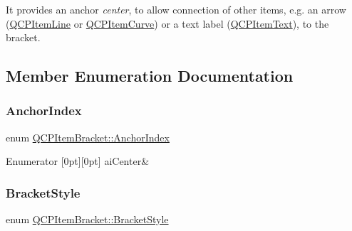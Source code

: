It provides an anchor {\itshape center}, to allow connection of other items, e.\+g. an arrow (\hyperlink{class_q_c_p_item_line}{Q\+C\+P\+Item\+Line} or \hyperlink{class_q_c_p_item_curve}{Q\+C\+P\+Item\+Curve}) or a text label (\hyperlink{class_q_c_p_item_text}{Q\+C\+P\+Item\+Text}), to the bracket. 

\subsection{Member Enumeration Documentation}
\mbox{\label{class_q_c_p_item_bracket_a7f3a6a56d67f71219ed220553f3dd861}} 
\subsubsection{\texorpdfstring{Anchor\+Index}{AnchorIndex}}
{\footnotesize\ttfamily enum \hyperlink{class_q_c_p_item_bracket_a7f3a6a56d67f71219ed220553f3dd861}{Q\+C\+P\+Item\+Bracket\+::\+Anchor\+Index}\hspace{0.3cm}{\ttfamily [protected]}}

\begin{DoxyEnumFields}{Enumerator}
[0pt][0pt]{}\mbox{\label{class_q_c_p_item_bracket_a7f3a6a56d67f71219ed220553f3dd861a17b57ef34cc05eadfe9becd1ad5b5242}} 
ai\+Center&\\
\hline

\end{DoxyEnumFields}
\mbox{\label{class_q_c_p_item_bracket_a7ac3afd0b24a607054e7212047d59dbd}} 
\subsubsection{\texorpdfstring{Bracket\+Style}{BracketStyle}}
{\footnotesize\ttfamily enum \hyperlink{class_q_c_p_item_bracket_a7ac3afd0b24a607054e7212047d59dbd}{Q\+C\+P\+Item\+Bracket\+::\+Bracket\+Style}}

